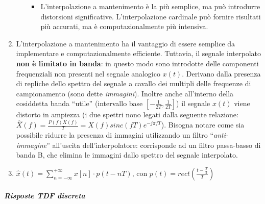 \documentclass[
]{article}
\providecommand{\tightlist}{%
  \setlength{\itemsep}{0pt}\setlength{\parskip}{0pt}}
\begin{document}
\begin{enumerate}
\begin{itemize}
    \begin{itemize}
    \tightlist
    \item
      L'interpolazione a mantenimento è la più semplice, ma può
      introdurre distorsioni significative. L'interpolazione cardinale
      può fornire risultati più accurati, ma è computazionalmente più
      intensiva.
    \end{itemize}
  \end{itemize}
\item
  L'interpolazione a mantenimento ha il vantaggio di essere semplice da
  implementare e computazionalmente efficiente. Tuttavia, il segnale
  interpolato \textbf{non è limitato in banda}: in questo modo sono
  introdotte delle componenti frequenziali non presenti nel segnale
  analogico \(x(t)\). Derivano dalla presenza di repliche dello spettro
  del segnale a cavallo dei multipli delle frequenze di campionamento
  (sono dette \emph{immagini}). Inoltre anche all'interno della
  cosiddetta banda ``utile'' (intervallo base
  \([-\frac{1}{2T}, \frac{1}{2T}]\)) il segnale \(x(t)\) viene distorto
  in ampiezza (i due spettri nono legati dalla seguente relazione:
  \(\hat{X}(f)=\frac{P(f)X(f)}{T}=X(f)sinc(fT)e^{-j\pi fT}\)). Bisogna
  notare come sia possibile ridurre la presenza di immagini utilizzando
  un filtro ``\emph{anti-immagine}'' all'uscita dell'interpolatore:
  corrisponde ad un filtro passa-basso di banda B, che elimina le
  immagini dallo spettro del segnale interpolato.
\item
  \(\hat{x}(t)=\sum_{n=-\infty}^{+\infty}x[n]\cdot p(t-nT)\text{, con } p(t)= rect(\frac{t-\frac{T}{2}}{T})\)
\end{enumerate}

\subparagraph{Risposte TDF discreta}\label{risposte-tdf-discreta}
\end{document}
